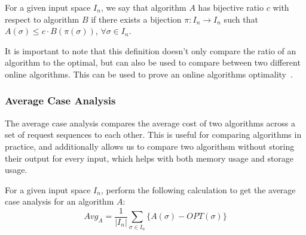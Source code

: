 \begin{definition}
    \label{def:bij}
    For a given input space $I_n$, we say that algorithm $A$ has bijective ratio $c$ with respect to algorithm $B$ if there exists a bijection $\pi:I_n \rightarrow I_n$ such that $A(\sigma) \leq c\cdot B(\pi(\sigma))$, $\forall \sigma \in I_n$. 
\end{definition}

It is important to note that this definition doesn't only compare the ratio of an algorithm to the optimal, but can also be used to compare between two different online algorithms. This can be used to prove an online algorithms optimality~\cite{bij2016}.

\subsubsection*{Average Case Analysis}
\label{sec:Avg}
The average case analysis compares the average cost of two algorithms across a set of request sequences to each other. This is useful for comparing algorithms in practice, and additionally allows us to compare two algorithsm without storing their output for every input, which helps with both memory usage and storage usage.

\begin{definition}
    \label{def:avg}
    For a given input space $I_n$, perform the following calculation to get the average case analysis for an algorithm $A$: 
    \begin{equation*}
        Avg_A = \frac{1}{|I_n|}\sum_{\sigma \in I_n} \{A(\sigma) - OPT(\sigma)\}
    \end{equation*}
\end{definition}